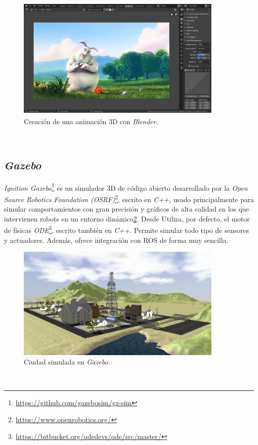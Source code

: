 \begin{figure} [h!]
	\begin{center}
		\includegraphics[width=10cm, height=6cm]{figs/blender}
	\end{center}
	\caption{Creación de una animación 3D con \textit{Blender}.}
	\label{fig:blender}
\end{figure}\

\subsection{\textit{Gazebo}}
\textit{Ignition Gazebo}\footnote{\url{https://github.com/gazebosim/gz-sim}} es un simulador 3D de código abierto desarrollado por la \textit{Open Source Robotics Foundation (OSRF)}\footnote{\url{https://www.openrobotics.org/}}, escrito en \textit{C++}, usado principalmente para simular comportamientos con gran precisión y gráficos de alta calidad en los que intervienen robots en un entorno dinámico\ref{fig:city}. Desde  Utiliza, por defecto, el motor de físicas \textit{ODE}\footnote{\url{https://bitbucket.org/odedevs/ode/src/master/}}, escrito también en \textit{C++}. Permite simular todo tipo de sensores y actuadores. Además, ofrece integración con ROS de forma muy sencilla.\\

\begin{figure} [h!]
	\begin{center}
		\includegraphics[width=10cm]{figs/city}
	\end{center}
	\caption{Ciudad simulada en \textit{Gazebo}.}
	\label{fig:city}
\end{figure}\

